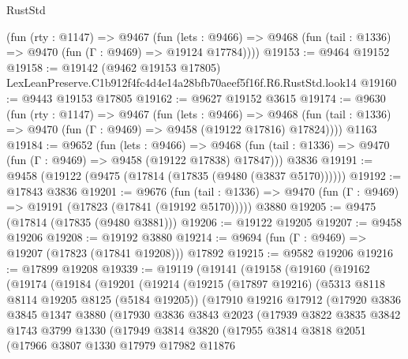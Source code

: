 \begin{lexlean}{RustStd}
\begin{coremodule}
    (fun (rty : @1147) =>
    @9467
      (fun (lets : @9466) =>
      @9468 (fun (tail : @1336) => @9470 (fun (Γ : @9469) => @19124 @17784))))
@19153 := @9464 @19152
@19158 := @19142
    (@9462 @19153 @17805)
    LexLeanPreserve.C1b912f4fc4d4e14a28bfb70aeef5f16f.R6.RustStd.look14
@19160 := @9443 @19153 @17805
@19162 := @9627 @19152 @3615
@19174 := @9630
    (fun (rty : @1147) =>
    @9467
      (fun (lets : @9466) =>
      @9468 (fun (tail : @1336) => @9470 (fun (Γ : @9469) => @9458 (@19122 @17816) @17824))))
    @1163
@19184 := @9652
    (fun (lets : @9466) =>
    @9468 (fun (tail : @1336) => @9470 (fun (Γ : @9469) => @9458 (@19122 @17838) @17847)))
    @3836
@19191 := @9458 (@19122 (@9475 (@17814 (@17835 (@9480 (@3837 @5170))))))
@19192 := @17843 @3836
@19201 := @9676
    (fun (tail : @1336) => @9470 (fun (Γ : @9469) => @19191 (@17823 (@17841 (@19192 @5170)))))
    @3880
@19205 := @9475 (@17814 (@17835 (@9480 @3881)))
@19206 := @19122 @19205
@19207 := @9458 @19206
@19208 := @19192 @3880
@19214 := @9694 (fun (Γ : @9469) => @19207 (@17823 (@17841 @19208))) @17892
@19215 := @9582 @19206
@19216 := @17899 @19208
@19339 := @19119
    (@19141
      (@19158
        (@19160
          (@19162
            (@19174
              (@19184
                (@19201
                  (@19214
                    (@19215
                      (@17897 @19216)
                      (@5313 @8118 @8114 @19205 @8125 (@5184 @19205))
                      (@17910
                        @19216
                        @17912
                        (@17920
                          @3836
                          @3845
                          @1347
                          @3880
                          (@17930
                            @3836
                            @3843
                            @2023
                            (@17939
                              @3822
                              @3835
                              @3842
                              @1743
                              @3799
                              @1330
                              (@17949
                                @3814
                                @3820
                                (@17955
                                  @3814
                                  @3818
                                  @2051
                                  (@17966
                                    @3807
                                    @1330
                                    @17979
                                    @17982
                                    @11876

\end{coremodule}
\end{lexlean}
